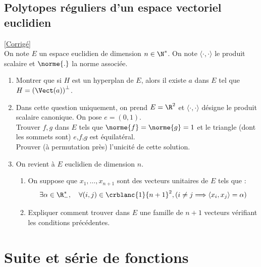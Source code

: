 \documentclass{book}
\begin{document}
	\section{Polytopes réguliers d'un espace vectoriel euclidien}
	\textcolor{blue}{\hyperref[sec:polytopes-reguliers-dun-espace-vectoriel-euclidien]{[Corrigé]}}\\
	\label{Polytopes réguliers d'un espace vectoriel euclidien}
	On note $E$ un espace euclidien de dimension $n\in\N^*$. On note $\langle\cdot,\cdot\rangle$ le produit scalaire et $\norme{.}$ la norme associée.
	\begin{enumerate}
		\item Montrer que si $H$ est un hyperplan de $E$, alors il existe $a$ dans $E$ tel que $H=\left(\Vect(a)\right)^\perp$.
		\item Dans cette question uniquement, on prend $E=\R^2$ et $\langle\cdot,\cdot\rangle$ désigne le produit scalaire canonique. On pose $e=(0,1)$.
		\\Trouver $f,g$ dans $E$ tels que $\norme{f}=\norme{g}=1$ et le triangle (dont les sommets sont) $e$,$f$,$g$ est équilatéral.
		\\Prouver (à permutation près) l'unicité de cette solution.
		\item On revient à $E$ euclidien de dimension $n$.
		\begin{enumerate}[label=\alph*.]
			\item On suppose que $x_1,\dots,x_{n+1}$ sont des vecteurs unitaires de $E$ tels que : $$\exists \alpha\in\R_-^*,\quad\forall(i,j)\in\crblanc{1}{n+1}^2, \left(i\neq j\Longrightarrow \langle x_i,x_j\rangle=\alpha\right)$$
			\item Expliquer comment trouver dans $E$ une famille de $n+1$ vecteurs vérifiant les conditions précédentes.
		\end{enumerate}	
	\end{enumerate}
	
\chapter{Suite et série de fonctions}
\end{document}
